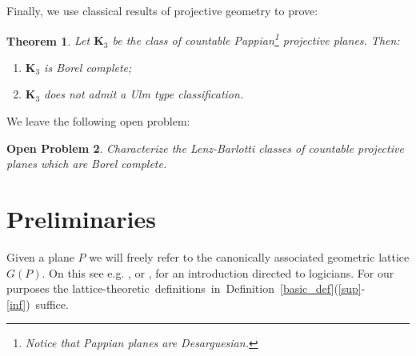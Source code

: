 \documentclass{amsart}
\newtheorem{theorem}{Theorem}%
\newtheorem{oproblem}[theorem]{Open Problem}
\numberwithin{claimcounter}{theorem}
\begin{document}
	Finally, we use classical results of projective geometry to prove:
	
		\begin{theorem}\label{des_theorem} Let $\mathbf{K}_3$ be the class of countable Pappian\footnote{Notice that Pappian planes are Desarguesian.} projective planes. Then:
\begin{enumerate}[(1)]
	\item $\mathbf{K}_3$ is Borel complete;
	\item $\mathbf{K}_3$ does not admit a Ulm type classification.
\end{enumerate}
\end{theorem}

We leave the following open problem:
	
	\begin{oproblem} Characterize the Lenz-Barlotti classes of countable projective planes which are Borel complete.
\end{oproblem}

	
	
\section{Preliminaries}\label{preliminaries}
	
	Given a plane $P$ we will freely refer to the canonically associated geometric lattice $G(P)$. On this see e.g. \cite{rota}, or \cite[Section 2]{paolini&hyttinen}, for an introduction directed to logicians. For our purposes the \mbox{lattice-theoretic definitions in Definition \ref{basic_def}(\ref{sup}-\ref{inf}) suffice.}
	
\end{document}
